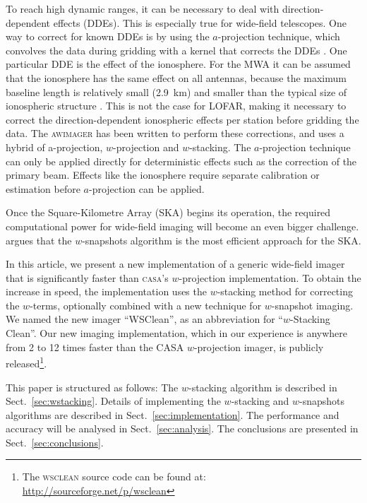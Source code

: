 \documentclass[useAMS,usenatbib]{mn2e}
\begin{document}
To reach high dynamic ranges, it can be necessary to deal with direction-dependent effects (DDEs). This is especially true for wide-field telescopes. One way to correct for known DDEs is by using the $a$-projection technique, which convolves the data during gridding with a kernel that corrects the DDEs \citep{aprojection-2008}. One particular DDE is the effect of the ionosphere. For the MWA it can be assumed that the ionosphere has the same effect on all antennas, because the maximum baseline length is relatively small (2.9~km) and smaller than the typical size of ionospheric structure \citep{lonsdale-calibration-approaches-ionosphere}. This is not the case for LOFAR, making it necessary to correct the direction-dependent ionospheric effects per station before gridding the data. The \textsc{awimager} \citep{awimager-2013} has been written to perform these corrections, and uses a hybrid of a-projection, $w$-projection and $w$-stacking. The $a$-projection technique can only be applied directly for deterministic effects such as the correction of the primary beam. Effects like the ionosphere require separate calibration or estimation before $a$-projection can be applied.

Once the Square-Kilometre Array (SKA) begins its operation, the required computational power for wide-field imaging will become an even bigger challenge. \citet{widefield-imaging-ska-cornwell} argues that the $w$-snapshots algorithm is the most efficient approach for the SKA.

In this article, we present a new implementation of a generic wide-field imager that is significantly faster than \textsc{casa}'s $w$-projection implementation. To obtain the increase in speed, the implementation uses the $w$-stacking method for correcting the $w$-terms, optionally combined with a new technique for $w$-snapshot imaging. We named the new imager ``WSClean'', as an abbreviation for ``$w$-Stacking Clean''. Our new imaging implementation, which in our experience is anywhere from 2 to 12 times faster than the CASA $w$-projection imager, is publicly released\footnote{The \textsc{wsclean} source code can be found at:\\\href{http://sourceforge.net/p/wsclean}{http://sourceforge.net/p/wsclean}}.

This paper is structured as follows: The $w$-stacking algorithm is described in Sect.~\ref{sec:wstacking}. Details of implementing the $w$-stacking and $w$-snapshots algorithms are described in Sect.~\ref{sec:implementation}. The performance and accuracy will be analysed in Sect.~\ref{sec:analysis}. The conclusions are presented in Sect.~\ref{sec:conclusions}.
\end{document}
